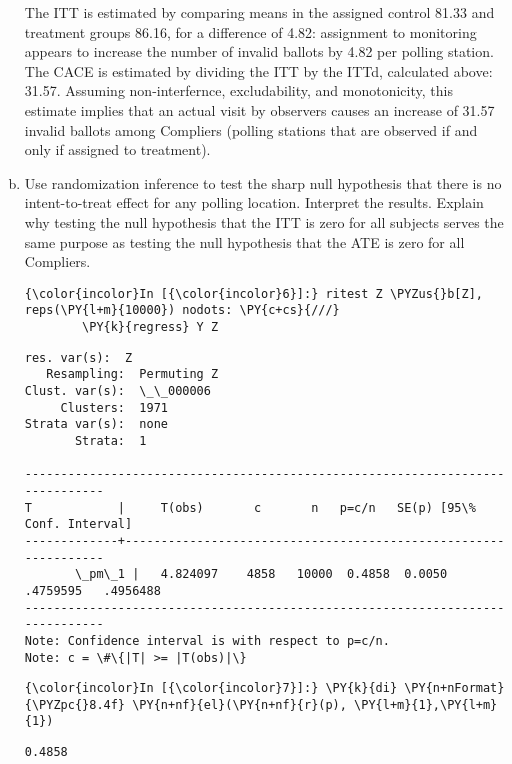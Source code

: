\documentclass[11pt,notitlepage]{article}\usepackage[]{graphicx}\usepackage[]{color}
\makeatletter
\newenvironment{kframe}{%
 \def\at@end@of@kframe{}%
 \ifinner\ifhmode%
  \def\at@end@of@kframe{\end{minipage}}%
  \begin{minipage}{\columnwidth}%
 \fi\fi%
 \def\FrameCommand##1{\hskip\@totalleftmargin \hskip-\fboxsep
 \colorbox{shadecolor}{##1}\hskip-\fboxsep
     \hskip-\linewidth \hskip-\@totalleftmargin \hskip\columnwidth}%
 \MakeFramed {\advance\hsize-\width
   \@totalleftmargin\z@ \linewidth\hsize
   \@setminipage}}%
 {\par\unskip\endMakeFramed%
 \at@end@of@kframe}
\newenvironment{knitrout}{}{} %
\makeatother
\begin{document}
\begin{enumerate}[a)]
The ITT is estimated by comparing means in the assigned control 81.33 and treatment groups 86.16, for a difference of 4.82: assignment to monitoring appears to increase the number of invalid ballots by 4.82 per polling station. The CACE is estimated by dividing the ITT by the ITTd, calculated above: 31.57. Assuming non-interfernce, excludability, and monotonicity, this estimate implies that an actual visit by observers causes an increase of 31.57 invalid ballots among Compliers (polling stations that are observed if and only if assigned to treatment).

\item Use randomization inference to test the sharp null hypothesis that there is no intent-to-treat effect for any polling location. Interpret the results. Explain why testing the null hypothesis that the ITT is zero for all subjects serves the same purpose as testing the null hypothesis that the ATE is zero for all Compliers.

\begin{knitrout}
\color{fgcolor}\begin{kframe}
   \begin{Verbatim}[commandchars=\\\{\}]
{\color{incolor}In [{\color{incolor}6}]:} ritest Z \PYZus{}b[Z], reps(\PY{l+m}{10000}) nodots: \PY{c+cs}{///}
        \PY{k}{regress} Y Z
\end{Verbatim}

    \begin{Verbatim}[commandchars=\\\{\}]
  res. var(s):  Z
   Resampling:  Permuting Z
Clust. var(s):  \_\_000006
     Clusters:  1971
Strata var(s):  none
       Strata:  1

------------------------------------------------------------------------------
T            |     T(obs)       c       n   p=c/n   SE(p) [95\% Conf. Interval]
-------------+----------------------------------------------------------------
       \_pm\_1 |   4.824097    4858   10000  0.4858  0.0050  .4759595   .4956488
------------------------------------------------------------------------------
Note: Confidence interval is with respect to p=c/n.
Note: c = \#\{|T| >= |T(obs)|\}

    \end{Verbatim}

    \begin{Verbatim}[commandchars=\\\{\}]
{\color{incolor}In [{\color{incolor}7}]:} \PY{k}{di} \PY{n+nFormat}{\PYZpc{}8.4f} \PY{n+nf}{el}(\PY{n+nf}{r}(p), \PY{l+m}{1},\PY{l+m}{1})
\end{Verbatim}

    \begin{Verbatim}[commandchars=\\\{\}]
  0.4858

    \end{Verbatim}

\end{kframe}
\end{knitrout}
\end{enumerate}
\end{document}
